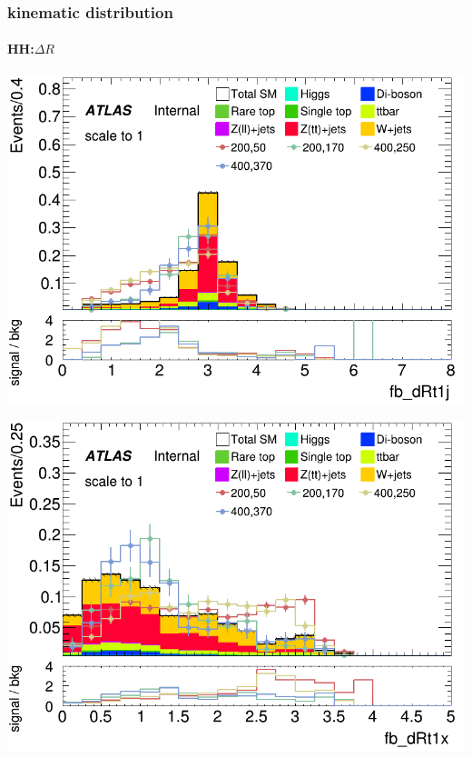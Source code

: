\documentclass[usenames,dvipsnames]{beamer}
\begin{document}
\begin{frame}
  \frametitle{kinematic distribution}
  \framesubtitle{HH:$\Delta R$}
    \begin{minipage}{0.32\textwidth}
        \centering
        \includegraphics[width=\textwidth]{graphics/HH_met_sig/HH_fb_dRt1j_norm.png}
    \end{minipage}
    \hfill
    \begin{minipage}{0.32\textwidth}
        \centering
       \includegraphics[width=\textwidth]{graphics/HH_met_sig/HH_fb_dRt1x_norm.png}
    \end{minipage}
    \hfill
    \begin{minipage}{0.32\textwidth}
        \centering

\end{minipage}
\end{frame}
\end{document}
